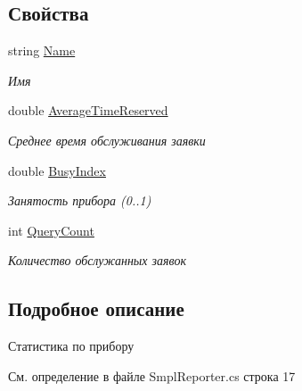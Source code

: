 \subsection*{Свойства}
\begin{DoxyCompactItemize}
\item 
string \hyperlink{class_s_m_p_l_sharp_1_1_utils_1_1_smpl_r_device_statisic_a7a9601632b7585ab8df008cd59698f0d}{Name}
\begin{DoxyCompactList}\small\item\em Имя \end{DoxyCompactList}\item 
double \hyperlink{class_s_m_p_l_sharp_1_1_utils_1_1_smpl_r_device_statisic_aefc83dcc8f91247e91d1966ada1d7885}{Average\-Time\-Reserved}
\begin{DoxyCompactList}\small\item\em Среднее время обслуживания заявки \end{DoxyCompactList}\item 
double \hyperlink{class_s_m_p_l_sharp_1_1_utils_1_1_smpl_r_device_statisic_a437aa023cf628ea90f8a0f7091fb7e27}{Busy\-Index}
\begin{DoxyCompactList}\small\item\em Занятость прибора (0..1) \end{DoxyCompactList}\item 
int \hyperlink{class_s_m_p_l_sharp_1_1_utils_1_1_smpl_r_device_statisic_ac8c73d6bf105ba2983b1160b4b037cef}{Query\-Count}
\begin{DoxyCompactList}\small\item\em Количество обслужанных заявок \end{DoxyCompactList}\end{DoxyCompactItemize}


\subsection{Подробное описание}
Статистика по прибору 



См. определение в файле Smpl\-Reporter.\-cs строка 17



